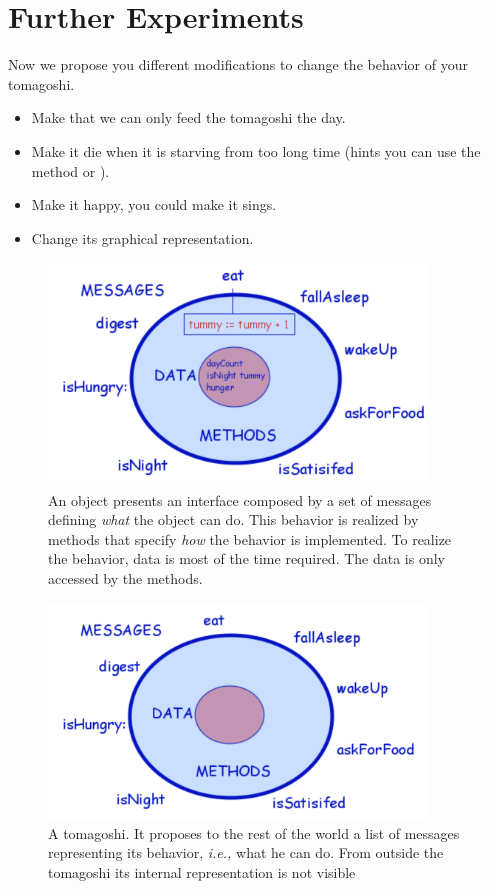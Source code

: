 \documentclass[a4paper,10pt,twoside]{book}
\begin{document}
\section{Further Experiments}
Now we propose you different modifications to change the behavior of your tomagoshi. 

\begin{itemize}
\item Make that we can only feed the tomagoshi the day. 
\item Make it die when it is starving from too long time (hints you can use the method 
 or ).
\item Make it happy, you could make it sings.
\item Change its graphical representation.  
\end{itemize}

\begin{figure}
\begin{center}
\includegraphics[width=10cm]{full}
\caption{An object presents an interface composed by a set of messages defining \textit{what} the object can do. This behavior is realized by methods that specify \textit{how} the behavior is implemented. To realize the behavior, data is most of the time required. The data is only accessed by the methods. \label{fig:full}}
\end{center}
\end{figure}


\begin{figure}
\begin{center}
\includegraphics[width=10cm]{messageOnly}
\caption{A tomagoshi. It proposes to the rest of the world a list of messages representing its 
behavior, \textit{i.e.,} what he can do. From outside the tomagoshi its internal representation is not visible\label{fig:messageOnly}}
\end{center}
\end{figure}
\end{document}
